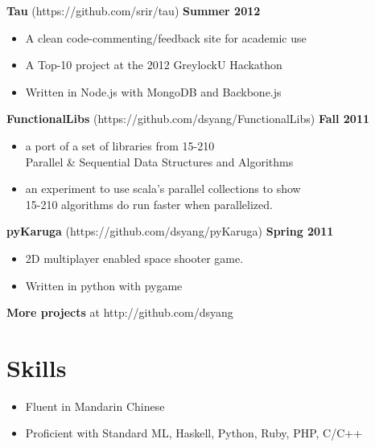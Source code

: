 \documentclass[sectioned]{dsyangres}
\begin{document}
\begin{resume}
\textbf{Tau} (https://github.com/srir/tau)
\hfill \textbf{Summer 2012}
  \begin{itemize} \itemsep -2pt
    \item A clean code-commenting/feedback site for academic use
    \item A Top-10 project at the 2012 GreylockU Hackathon
    \item Written in Node.js with MongoDB and Backbone.js
  \end{itemize}

\textbf{FunctionalLibs} (https://github.com/dsyang/FunctionalLibs)
\hfill \textbf{Fall 2011}
  \begin{itemize} \itemsep -2pt
    \item a port of a set of libraries from 15-210 \\
      Parallel \& Sequential Data Structures and Algorithms
    \item an experiment to use scala's parallel collections to show \\
      15-210 algorithms do run faster when parallelized.
  \end{itemize}

\textbf{pyKaruga} (https://github.com/dsyang/pyKaruga) \hfill \textbf{Spring 2011}
  \begin{itemize} \itemsep -2pt
    \item 2D multiplayer enabled space shooter game.
    \item Written in python with pygame
  \end{itemize}


\textbf{More projects} at http://github.com/dsyang

\section{Skills}

\begin{itemize} \itemsep -2pt
  \item Fluent in Mandarin Chinese
  \item Proficient with Standard ML, Haskell, Python, Ruby, PHP, C/C++
\end{itemize}


\end{resume}
\end{document}
